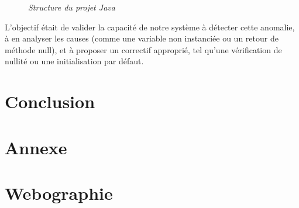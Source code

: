 \documentclass[12pt,a4paper]{report}
\begin{document}
	\begin{figure}[H]
		\centering
		\caption{\textit{Structure du projet Java}}
		\label{fig:premier-test}
	\end{figure}
	
	L'objectif était de valider la capacité de notre système à détecter cette anomalie, à en analyser les causes (comme une variable non instanciée ou un retour de méthode null), et à proposer un correctif approprié, tel qu'une vérification de nullité ou une initialisation par défaut.
	
	
	
	
	
	
	
	
	\chapter*{Conclusion}
	
	\chapter*{Annexe}
	
	\chapter*{Webographie}
	
\end{document}
